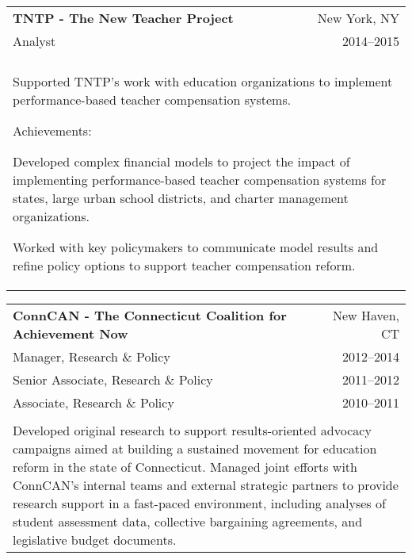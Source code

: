\documentclass[letterpaper,11pt]{article}
\begin{document}
\begin{minipage}{.9\textwidth}

\noindent\begin{tabular*}{\textwidth}{l @{\extracolsep{\fill}} r}
  \textbf{TNTP - The New Teacher Project} & \ {\color{Gray}New York, NY} \\
  {\color{Gray}Analyst} & \ {\color{Gray}2014--2015} \\\\
  \multicolumn{2}{p{\textwidth}}{Supported TNTP's work with education organizations to implement performance-based teacher compensation systems.

  \vspace{2mm}
  Achievements:
  \begin{itemize*}
  
    \item Developed complex financial models to project the impact of implementing performance-based teacher compensation systems for states, large urban school districts, and charter management organizations. 
    \item Worked with key policymakers to communicate model results and refine policy options to support teacher compensation reform. 

  \end{itemize*}}
\end{tabular*}

\noindent\begin{tabular*}{\textwidth}{l @{\extracolsep{\fill}} r}
  \textbf{ConnCAN - The Connecticut Coalition for Achievement Now}& \ {\color{Gray}New Haven, CT} \\
  {\color{Gray}Manager, Research \& Policy} & \ {\color{Gray}2012--2014} \\
  {\color{Gray}Senior Associate, Research \& Policy} & \ {\color{Gray}2011--2012} \\
  {\color{Gray}Associate, Research \& Policy} & \ {\color{Gray}2010--2011} \\\\
  \multicolumn{2}{p{\textwidth}}{Developed original research to support results-oriented advocacy campaigns aimed at building a sustained movement for education reform in the state of Connecticut. Managed joint efforts with ConnCAN's internal teams and external strategic partners to provide research support in a fast-paced environment, including analyses of student assessment data, collective bargaining agreements, and legislative budget documents. 

}
\end{tabular*}
\end{minipage}
\end{document}
